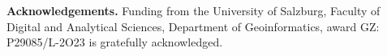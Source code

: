 \documentclass[12pt,a4paper,oneside]{article}
\def \newsection{\vspace{12pt}\textbf}
\begin{document}
{\bf Acknowledgements.} Funding from the University of Salzburg, Faculty of Digital and Analytical Sciences, Department of Geoinformatics, award GZ: P29085/L-2O23 is gratefully acknowledged. 

%
%
%


\end{document}
